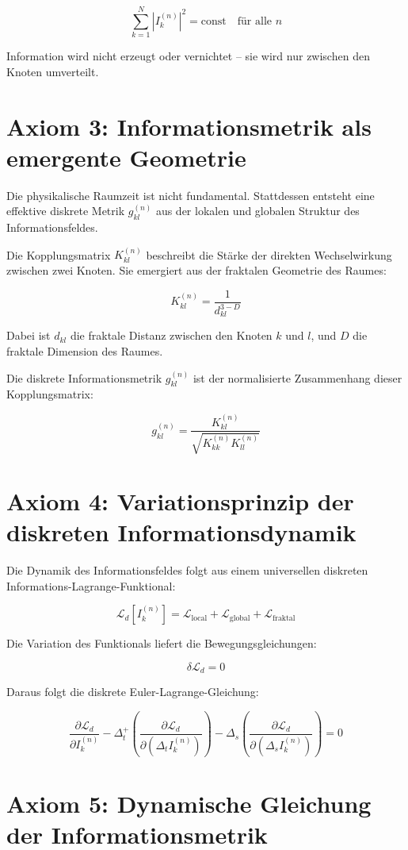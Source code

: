 \[
\sum_{k=1}^{N} |I_k^{(n)}|^2 = \text{const} \quad \text{für alle } n
\]

Information wird nicht erzeugt oder vernichtet – sie wird nur zwischen den Knoten umverteilt.

\section{Axiom 3: Informationsmetrik als emergente Geometrie}

Die physikalische Raumzeit ist nicht fundamental. Stattdessen entsteht eine effektive diskrete Metrik \( g_{kl}^{(n)} \) aus der lokalen und globalen Struktur des Informationsfeldes.

Die Kopplungsmatrix \( K_{kl}^{(n)} \) beschreibt die Stärke der direkten Wechselwirkung zwischen zwei Knoten. Sie emergiert aus der fraktalen Geometrie des Raumes:

\[
K_{kl}^{(n)} = \frac{1}{d_{kl}^{3-D}}
\]

Dabei ist \( d_{kl} \) die fraktale Distanz zwischen den Knoten \( k \) und \( l \), und \( D \) die fraktale Dimension des Raumes.

Die diskrete Informationsmetrik \( g_{kl}^{(n)} \) ist der normalisierte Zusammenhang dieser Kopplungsmatrix:

\[
g_{kl}^{(n)} = \frac{K_{kl}^{(n)}}{\sqrt{K_{kk}^{(n)} K_{ll}^{(n)}}}
\]

\section{Axiom 4: Variationsprinzip der diskreten Informationsdynamik}

Die Dynamik des Informationsfeldes folgt aus einem universellen diskreten Informations-Lagrange-Funktional:

\[
\mathcal{L}_d[I_k^{(n)}] = \mathcal{L}_{\text{local}} + \mathcal{L}_{\text{global}} + \mathcal{L}_{\text{fraktal}}
\]

Die Variation des Funktionals liefert die Bewegungsgleichungen:

\[
\delta \mathcal{L}_d = 0
\]

Daraus folgt die diskrete Euler-Lagrange-Gleichung:

\[
\frac{\partial \mathcal{L}_d}{\partial I_k^{(n)}} - \Delta_t^+ \left( \frac{\partial \mathcal{L}_d}{\partial (\Delta_t I_k^{(n)})} \right) - \Delta_s \left( \frac{\partial \mathcal{L}_d}{\partial (\Delta_s I_k^{(n)})} \right) = 0
\]

\section{Axiom 5: Dynamische Gleichung der Informationsmetrik}

